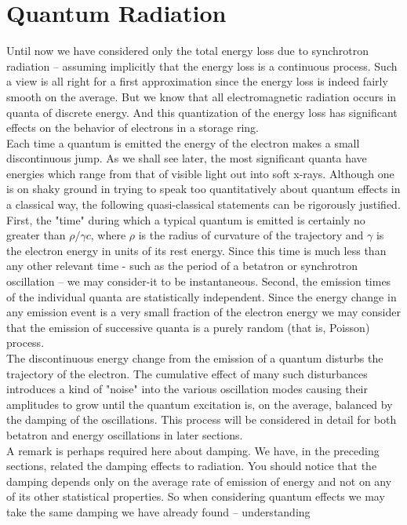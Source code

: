 \section{Quantum Radiation} \label{sec:5.1}

Until now we have considered only the total energy loss due to synchrotron radiation -- assuming implicitly that the energy loss is a continuous process. Such a view is all right for a first
 approximation since the energy loss is indeed fairly smooth on the average. But we know that all electromagnetic radiation occurs in quanta of discrete energy. And this quantization of the energy loss has significant effects on the behavior of electrons in a storage ring.\\
Each time a quantum is emitted the energy of the electron makes a small discontinuous jump. As we shall see later, the most significant quanta have energies which range from that of visible light out into soft x-rays. Although one is on shaky ground in trying to speak too quantitatively about quantum effects in a classical way, the following quasi-classical statements can be rigorously
 justified. First, the "time" during which a typical quantum is emitted is certainly no greater
than $\rho/\gamma c$, where $\rho$ is the radius of curvature of the trajectory and $\gamma$ is the electron energy in units of its rest energy. Since this time is much less than any other
relevant time - such as the period of a betatron or synchrotron oscillation -- we may consider-it
 to be instantaneous. Second, the emission times of the individual quanta are statistically
 independent. Since the energy change in any emission event is a very small fraction of the electron energy we may consider that the emission of successive quanta is a purely random (that is, Poisson) process.\\
The discontinuous energy change from the emission of a quantum disturbs the trajectory of the electron. The cumulative effect of many such disturbances introduces a kind of "noise" into the various oscillation modes causing their amplitudes to grow until the quantum excitation is, on the average, balanced by the damping of the oscillations. This process will be considered in detail for both betatron and energy oscillations in later sections.\\
A remark is perhaps required here about damping. We have, in the preceding sections, related the damping effects to radiation. You should notice that the damping depends only on the average rate of emission of energy and not on any of its other statistical properties. So when considering quantum effects we may take the same damping we have already found -- understanding
